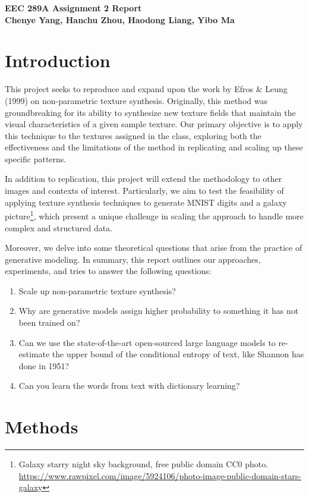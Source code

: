 \documentclass{article}
\begin{document}
\noindent
\textbf{\large EEC 289A Assignment 2 Report} \\
\textbf{\small Chenye Yang, Hanchu Zhou, Haodong Liang, Yibo Ma}



\section{Introduction}

This project seeks to reproduce and expand upon the work by Efros \& Leung (1999) on non-parametric texture synthesis. Originally, this method was groundbreaking for its ability to synthesize new texture fields that maintain the visual characteristics of a given sample texture. Our primary objective is to apply this technique to the textures assigned in the class, exploring both the effectiveness and the limitations of the method in replicating and scaling up these specific patterns.

In addition to replication, this project will extend the methodology to other images and contexts of interest. Particularly, we aim to test the feasibility of applying texture synthesis techniques to generate MNIST digits and a galaxy picture\footnote{Galaxy starry night sky background, free public domain CC0 photo. \url{https://www.rawpixel.com/image/5924106/photo-image-public-domain-stars-galaxy}}, which present a unique challenge in scaling the approach to handle more complex and structured data.

Moreover, we delve into some theoretical questions that arise from the practice of generative modeling. In summary, this report outlines our approaches, experiments, and tries to answer the following questions:
\begin{enumerate}
    \item Scale up non-parametric texture synthesis?
    \item Why are generative models assign higher probability to something it has not been trained on?
    \item Can we use the state-of-the-art open-sourced large language models to re-estimate the upper bound of the conditional entropy of text, like Shannon has done in 1951?
    \item Can you learn the words from text with dictionary learning?
\end{enumerate}




\section{Methods}
\end{document}
